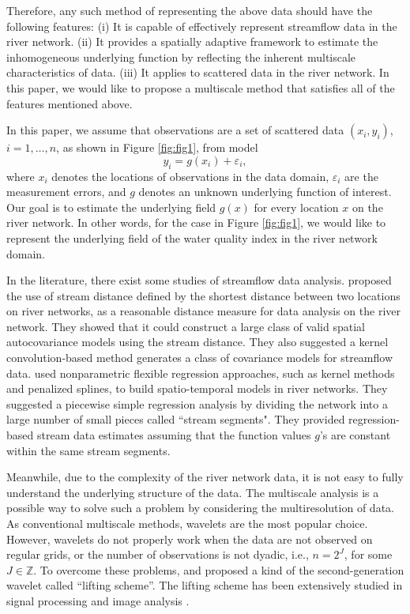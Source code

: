 \documentclass[11pt,titlepage]{article}
\begin{document}
Therefore, any such method of representing the above data should have the following features: (i) It is capable of effectively represent streamflow data in the river network. (ii) It provides a spatially adaptive framework to estimate the inhomogeneous underlying function by reflecting the inherent multiscale characteristics of data. (iii) It applies to scattered data in the river network. In this paper, we would like to propose a multiscale method that satisfies all of the features mentioned above. 

In this paper, we assume that observations are a set of scattered data $(x_i, y_i)$, $i=1,\ldots,n$, as shown in Figure \ref{fig:fig1}, from model 
\begin{equation}\label{eq:scattered}
y_i = g(x_i)+\varepsilon_i, 
\end{equation}
where $x_i$ denotes the locations of observations in the data domain, $\varepsilon_i$ are the measurement errors, and $g$  denotes an unknown underlying function of interest. Our goal is to estimate the underlying field $g(x)$ for every location $x$ on the river network. In other words, for the case in Figure \ref{fig:fig1}, we would like to represent the underlying field of the water quality index in the river network domain. 

In the literature, there exist some studies of streamflow data analysis. \cite{VerHoef(2006)} proposed the use of stream distance  defined by the shortest distance between two locations on river networks, as a reasonable distance measure for data analysis on the river network. They showed that it could construct a large class of valid spatial autocovariance models using the stream distance. They also suggested a kernel convolution-based method generates a class of covariance models for streamflow data. \cite{ODonnell2014} used nonparametric flexible regression approaches, such as kernel methods and penalized splines, to build spatio-temporal models in river networks. They suggested a piecewise simple regression analysis by dividing the network into a large number of small pieces called ``stream segments".  They provided regression-based stream data estimates  assuming that the function values $g$'s are constant within the same stream segments.

Meanwhile, due to the complexity of the river network data, it is not easy to fully understand the underlying structure of the  data. The multiscale analysis is a possible way to solve such a problem by considering the multiresolution of data. As conventional multiscale methods, wavelets are the most popular choice. However, wavelets do not properly work when the data are not observed on regular grids, or the number of observations is not dyadic, i.e., $n=2^{J}$, for some $J\in \mathbb{Z}$. To overcome these problems, \citet{Sweldens1996} and \citet{Sweldens1998} proposed a kind of the second-generation wavelet called ``lifting scheme''. The lifting scheme has been extensively studied in signal processing and image analysis \citep{Jansen2005}. 
\end{document}
